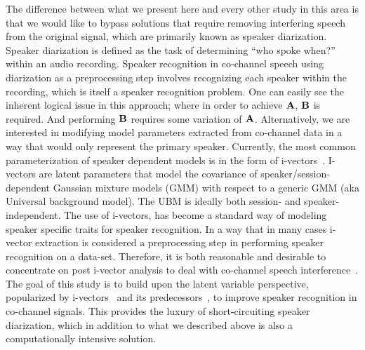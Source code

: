 \documentclass[journal]{IEEEtran}
\begin{document}
The difference between what we present here and every other study in this area is that we would like to bypass solutions that require removing interfering speech from the original signal, which are primarily known as speaker diarization. Speaker diarization is defined as the task of determining ``who spoke when?'' within an audio recording. 
Speaker recognition in co-channel speech using diarization as a preprocessing step involves recognizing each speaker within the recording, which is itself a speaker recognition problem. 
One can easily see the inherent logical issue in this approach; where in order to achieve $\bf A$, $\bf B$ is required. And performing $\bf B$ requires some variation of $\bf A$.
Alternatively, we are interested in modifying model parameters extracted from co-channel data in a way that would only represent the primary speaker. 
Currently, the most common parameterization of speaker dependent models is in the form of i-vectors~\cite{dehak2011front}. 
I-vectors are latent parameters that model the covariance of speaker/session-dependent Gaussian mixture models (GMM) with respect to a generic GMM (aka Universal background model). The UBM is ideally both session- and speaker-independent.
The use of i-vectors, has become a standard way of modeling speaker specific traits for speaker recognition. 
In a way that in many cases i-vector extraction is considered a preprocessing step in performing speaker recognition on a data-set. 
Therefore, it is both reasonable and desirable to concentrate on post i-vector analysis to deal with co-channel speech interference~\cite{ivector_challenge}. 
The goal of this study is to build upon the latent variable perspective, popularized by i-vectors~\cite{dehak2011front} and its predecessors~\cite{kenny2014jfa}, to improve speaker recognition in co-channel signals. 
This provides the luxury of short-circuiting speaker diarization, which in addition to what we described above is also a computationally intensive solution. 
\end{document}
